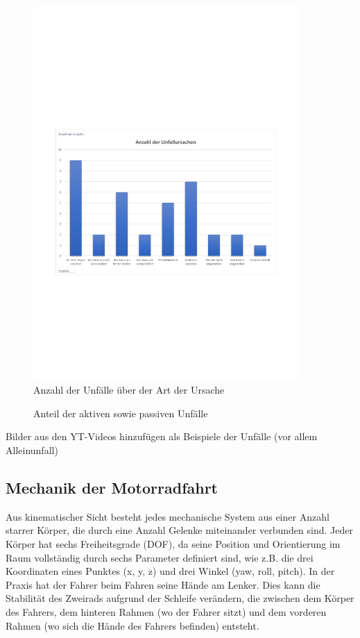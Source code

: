 \begin{figure}
	\centering
	\includegraphics[width=0.9\textwidth]{Bilder/youtube_Statistik_AnzahlUnfallUrsachen.pdf}
	\caption{Anzahl der Unfälle über der Art der Ursache}
	\label{fig:youtube_Statistik_AnzahlUnfallUrsachen}
\end{figure}
\begin{figure}
	\centering
	\caption{Anteil der aktiven sowie passiven Unfälle}
	\label{fig:youtube_Statistik_AktivPassivUnfall}
\end{figure}

Bilder aus den YT-Videos hinzufügen als Beispiele der Unfälle (vor allem Alleinunfall)


\subsection{Mechanik der Motorradfahrt} %
Aus kinematischer Sicht besteht jedes mechanische System aus einer Anzahl starrer Körper, die durch eine Anzahl Gelenke miteinander verbunden sind. Jeder Körper hat sechs Freiheitsgrade (DOF), da seine Position und Orientierung im Raum vollständig durch sechs Parameter definiert sind, wie z.B. die drei Koordinaten eines Punktes (x, y, z) und drei Winkel (yaw, roll, pitch).
In der Praxis hat der Fahrer beim Fahren seine Hände am Lenker. Dies kann die Stabilität des Zweirads aufgrund der Schleife verändern, die zwischen dem Körper des Fahrers, dem hinteren Rahmen (wo der Fahrer sitzt) und dem vorderen Rahmen (wo sich die Hände des Fahrers befinden) entsteht.\citep{Cossalter2014}

